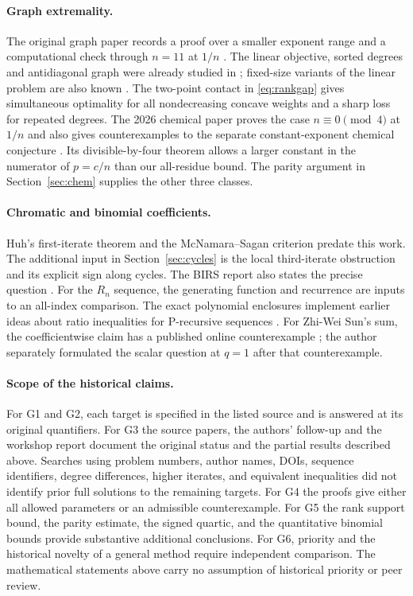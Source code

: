\documentclass[11pt,a4paper]{article}
\theoremstyle{definition}\newtheorem{problem}[theorem]{Problem}
\begin{document}
\paragraph{Graph extremality.}
The original graph paper records a proof over a smaller exponent range
and a computational check through $n=11$ at $1/n$ \cite{ksfd}. The
linear objective, sorted degrees and antidiagonal graph were already
studied in \cite{abd}; fixed-size variants of the linear problem are
also known \cite{adr}. The two-point contact in
\eqref{eq:rankgap} gives simultaneous optimality for all nondecreasing concave
weights and a sharp loss for repeated degrees. The 2026 chemical
paper proves the case $n\equiv0\pmod4$ at $1/n$ and also gives
counterexamples to the separate constant-exponent chemical conjecture
\cite{dfks}. Its divisible-by-four theorem allows a larger
constant in the numerator of $p=c/n$ than our all-residue bound.
The parity argument in Section~\ref{sec:chem} supplies the other
three classes.

\paragraph{Chromatic and binomial coefficients.}
Huh's first-iterate theorem and the McNamara--Sagan criterion predate
this work. The additional input in Section~\ref{sec:cycles} is the
local third-iterate obstruction and its explicit sign along cycles.
The BIRS report also states the precise question
\cite{birs}. For the $R_n$ sequence, the generating function and
recurrence are inputs to an all-index comparison. The exact polynomial
enclosures implement earlier ideas about ratio inequalities for
P-recursive sequences \cite{bysun,houzhang}. For Zhi-Wei Sun's sum,
the coefficientwise claim has a published online counterexample
\cite{zwsun}; the author separately formulated the scalar question
at $q=1$ after that counterexample.

\paragraph{Scope of the historical claims.}
For G1 and G2, each target is specified in the listed source and is
answered at its original quantifiers. For G3 the source papers,
the authors' follow-up and the workshop report document the original
status and the partial results described above. Searches using problem
numbers, author names, DOIs, sequence identifiers, degree differences,
higher iterates, and equivalent inequalities did not identify prior
full solutions to the remaining targets. For G4 the proofs give either
all allowed parameters or an admissible counterexample. For G5 the
rank support bound, the parity estimate, the signed quartic, and
the quantitative binomial bounds provide substantive additional
conclusions. For G6, priority and the historical novelty of a general
method require independent comparison. The mathematical statements
above carry no assumption of historical priority or peer review.
\end{document}
